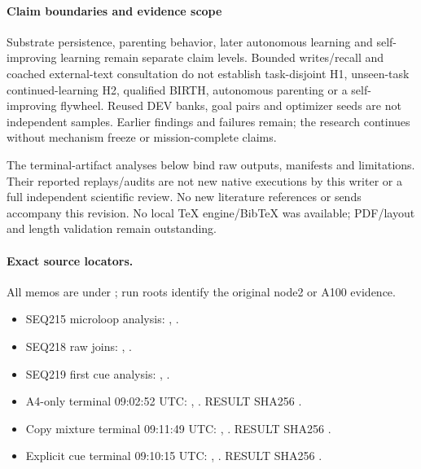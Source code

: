 \documentclass[11pt]{article}
\begin{document}
\paragraph{Claim boundaries and evidence scope}

Substrate persistence, parenting behavior, later autonomous learning and
self-improving learning remain separate claim levels. Bounded writes/recall
and coached external-text consultation do not establish task-disjoint H1,
unseen-task continued-learning H2, qualified BIRTH, autonomous parenting or
a self-improving flywheel. Reused DEV banks, goal pairs and optimizer seeds
are not independent samples. Earlier findings and failures remain; the research
continues without mechanism freeze or mission-complete claims.

The terminal-artifact analyses below bind raw outputs, manifests and limitations.
Their reported replays/audits are not new native executions by this writer or
a full independent scientific review. No new literature references or sends
accompany this revision. No local TeX engine/BibTeX was available; PDF/layout
and length validation remain outstanding.

\paragraph{Exact source locators.}
All memos are under ; run roots identify the original node2 or A100 evidence.
\begin{itemize}
\item SEQ215 microloop analysis: , .
\item SEQ218 raw joins: , .
\item SEQ219 first cue analysis: , .
\item A4-only terminal 09:02:52 UTC: , . RESULT SHA256 .
\item Copy mixture terminal 09:11:49 UTC: , . RESULT SHA256 .
\item Explicit cue terminal 09:10:15 UTC: , . RESULT SHA256 .
\end{itemize}
\end{document}
